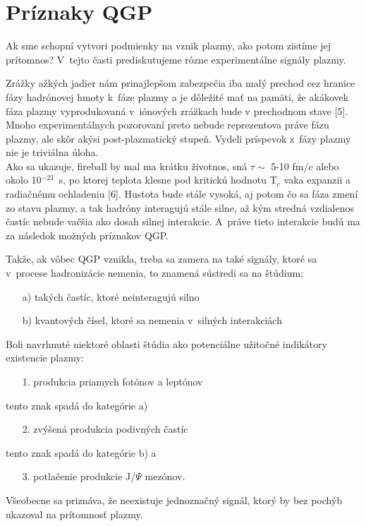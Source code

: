 \section{Príznaky QGP}
Ak sme schopní vytvori\softt{} podmienky na vznik plazmy, ako potom
zistíme jej prí\-tom\-nos\softt{}? V~tejto časti prediskutujeme
rôzne experimentálne signály plazmy.

Zrážky \softt{}ažkých jadier nám prinajlepšom
zabezpečia iba malý prechod cez hranice fázy
hadrónovej hmoty k~fáze plazmy a je dôležité  mať na
pamäti, že akáko\softl{}vek fáza plazmy vyprodukovaná
v~iónových zrážkach bude v prechodnom stave [5]. Mnoho
experimentálnych pozorovaní preto nebude reprezentova\softt{}
práve fázu plazmy, ale skôr akýsi post-plazmatický stupeň.
Vydeli\softt{} príspevok z~fázy plazmy nie je triviálna úloha. \\
\hspace*{0.45cm} Ako sa ukazuje, fireball by mal ma\softt{} krátku
životnos\softt{}, sná\softd{} $\tau\sim$ 5-10 fm/c alebo okolo
10$^{-23}$~s, po ktorej teplota klesne pod kritickú hodnotu T$_{c}$
v\softd{}aka expanzii a radiačnému ochladeniu [6]. Hustota bude
stále vysoká, aj potom čo sa fáza zmení zo stavu plazmy, a tak
hadróny interagujú stále silne, až kým stredná
vzdialenos\softt{} častíc nebude vačšia ako dosah silnej
interakcie. A~práve tieto interakcie budú ma\softt{} za následok
 možných príznakov QGP.

Takže, ak vôbec QGP vznikla, treba sa zamera\softt{} na také
signály, ktoré sa  v~procese hadronizácie nemenia, to znamená
sústredi\softt{} sa na štúdium:
\begin{enumerate}
\item[a)] takých častíc, ktoré neinteragujú silno
\item[b)] kvantových čísel, ktoré sa nemenia v~silných
  interakciách
\end{enumerate}
Boli navrhnuté niektoré oblasti štúdia ako potenciálne
užitočné indikátory existencie plazmy:
\begin{enumerate}
\item[1.] produkcia priamych fotónov a leptónov
\end{enumerate}
tento znak spadá do kategórie a)
\begin{enumerate}
\item[2.] zvýšená produkcia podivných častíc
\end{enumerate}
tento znak spadá do kategórie b) a
\begin{enumerate}
\item[3.] potlačenie produkcie J/$\Psi$ mezónov.
\end{enumerate}
Všeobecne sa priznáva, že neexistuje jednoznačný signál, ktorý by bez pochýb
ukazoval na prítomnosť plazmy.

